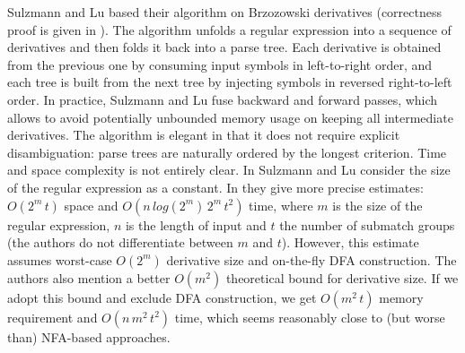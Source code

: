\documentclass[AMA,STIX1COL]{WileyNJD-v2}
\begin{document}
Sulzmann and Lu based their algorithm on Brzozowski derivatives \cite{SL14}
(correctness proof is given in \cite{ADU16}).
The algorithm unfolds a regular expression into a sequence of derivatives
and then folds it back into a parse tree.
Each derivative is obtained from the previous one by consuming input symbols in left-to-right order,
and each tree is built from the next tree by injecting symbols in reversed right-to-left order.
In practice, Sulzmann and Lu fuse backward and forward passes,
which allows to avoid potentially unbounded memory usage on keeping all intermediate derivatives.
The algorithm is elegant in that it does not require explicit disambiguation:
parse trees are naturally ordered by the longest criterion.
Time and space complexity is not entirely clear.
In \cite{SL14} Sulzmann and Lu consider the size of the regular expression as a constant.
In \cite{SL13} they give more precise estimates: $O(2^m \, t)$ space and $O(n \, log(2^m) \, 2^m \, t^2)$ time,
where $m$ is the size of the regular expression,
$n$ is the length of input
and $t$ the number of submatch groups (the authors do not differentiate between $m$ and $t$).
However, this estimate assumes worst-case $O(2^m)$ derivative size and on-the-fly DFA construction.
The authors also mention a better $O(m^2)$ theoretical bound for derivative size.
If we adopt this bound and exclude DFA construction, we get $O(m^2 \, t)$ memory requirement and $O(n \, m^2 \, t^2)$ time,
which seems reasonably close to (but worse than) NFA-based approaches.
\\
\end{document}
